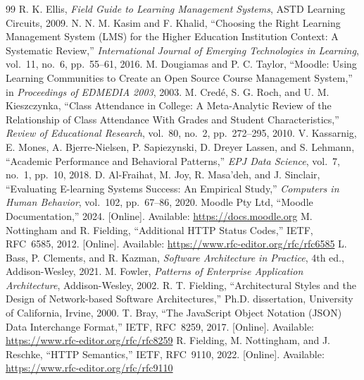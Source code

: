 \clearpage
{}
{}
\renewcommand{\refname}{References}
\begin{thebibliography}{99}
\setlength{\itemsep}{0.4em}
 R. K. Ellis, \textit{Field Guide to Learning Management Systems}, ASTD Learning Circuits, 2009.
 N. N. M. Kasim and F. Khalid, ``Choosing the Right Learning Management System ({LMS}) for the Higher Education Institution Context: A Systematic Review,'' \textit{International Journal of Emerging Technologies in Learning}, vol.~11, no.~6, pp.~55--61, 2016.
 M. Dougiamas and P. C. Taylor, ``Moodle: Using Learning Communities to Create an Open Source Course Management System,'' in \textit{Proceedings of EDMEDIA 2003}, 2003.
 M. Cred{\'e}, S. G. Roch, and U. M. Kieszczynka, ``Class Attendance in College: A Meta-Analytic Review of the Relationship of Class Attendance With Grades and Student Characteristics,'' \textit{Review of Educational Research}, vol.~80, no.~2, pp.~272--295, 2010.
 V. Kassarnig, E. Mones, A. Bjerre-Nielsen, P. Sapiezynski, D. Dreyer Lassen, and S. Lehmann, ``Academic Performance and Behavioral Patterns,'' \textit{EPJ Data Science}, vol.~7, no.~1, pp.~10, 2018.
 D. Al-Fraihat, M. Joy, R. Masa'deh, and J. Sinclair, ``Evaluating {E-learning} Systems Success: An Empirical Study,'' \textit{Computers in Human Behavior}, vol.~102, pp.~67--86, 2020.
 Moodle Pty Ltd, ``Moodle Documentation,'' 2024. [Online]. Available: \url{https://docs.moodle.org}
 M. Nottingham and R. Fielding, ``Additional {HTTP} Status Codes,'' IETF, RFC~6585, 2012. [Online]. Available: \url{https://www.rfc-editor.org/rfc/rfc6585}
 L. Bass, P. Clements, and R. Kazman, \textit{Software Architecture in Practice}, 4th ed., Addison-Wesley, 2021.
 M. Fowler, \textit{Patterns of Enterprise Application Architecture}, Addison-Wesley, 2002.
 R. T. Fielding, ``Architectural Styles and the Design of Network-based Software Architectures,'' Ph.D. dissertation, University of California, Irvine, 2000.
 T. Bray, ``The {JavaScript} Object Notation ({JSON}) Data Interchange Format,'' IETF, RFC~8259, 2017. [Online]. Available: \url{https://www.rfc-editor.org/rfc/rfc8259}
 R. Fielding, M. Nottingham, and J. Reschke, ``{HTTP} Semantics,'' IETF, RFC~9110, 2022. [Online]. Available: \url{https://www.rfc-editor.org/rfc/rfc9110}

\end{thebibliography}
